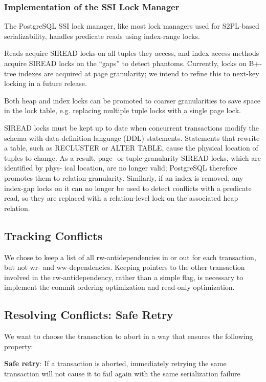\documentclass[11pt]{article}
\begin{document}
\subsubsection{Implementation of the SSI Lock Manager}
\label{sec:org909682f}
The PostgreSQL SSI lock manager, like most lock managers used for S2PL-based serializability, handles
predicate reads using index-range locks.

Reads acquire SIREAD locks on all tuples they access, and index access methods acquire SIREAD locks on
the “gaps” to detect phantoms. Currently, locks on B+-tree indexes are acquired at page granularity;
we intend to refine this to next-key locking in a future release.

Both heap and index locks can be promoted to coarser granularities to save space in the lock table,
e.g. replacing multiple tuple locks with a single page lock.

SIREAD locks must be kept up to date when concurrent transactions modify the schema with
data-definition language (DDL) statements. Statements that rewrite a table, such as RECLUSTER or ALTER
TABLE, cause the physical location of tuples to change. As a result, page- or tuple-granularity SIREAD
locks, which are identified by phys- ical location, are no longer valid; PostgreSQL therefore promotes
them to relation-granularity. Similarly, if an index is removed, any index-gap locks on it can no
longer be used to detect conflicts with a predicate read, so they are replaced with a relation-level
lock on the associated heap relation.
\subsection{Tracking Conflicts}
\label{sec:org047069a}
We chose to keep a list of all rw-antidependencies in or out for each transaction, but not wr- and
ww-dependencies. Keeping pointers to the other transaction involved in the rw-antidependency, rather
than a simple flag, is necessary to implement the commit ordering optimization and read-only
optimization.
\subsection{Resolving Conflicts: Safe Retry}
\label{sec:org0f1f648}
We want to choose the transaction to abort in a way that ensures the following property:

\textbf{Safe retry}: If a transaction is aborted, immediately retrying the same transaction will not cause it
to fail again with the same serialization failure
\end{document}
